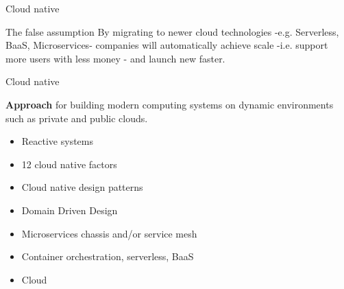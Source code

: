 \documentclass[aspectratio=169]{beamer}
\begin{document}
{
    \begin{frame}
    \end{frame}
}



\begin{frame}{Cloud native}

\begin{alertblock}{The false assumption}
By migrating to newer cloud technologies -e.g. Serverless, BaaS, Microservices- companies will automatically achieve scale -i.e. support more users with less money - and launch new faster.
\end{alertblock}


\end{frame}



\begin{frame}{Cloud native}

\textbf{Approach} for building modern computing systems on dynamic environments such as private and public clouds.

	\begin{itemize}
		\item Reactive systems
		\item 12 cloud native factors
        \item Cloud native design patterns
        \item Domain Driven Design
		\item Microservices chassis and/or service mesh
        \item Container orchestration, serverless, BaaS
        \item Cloud
	\end{itemize}

\end{frame}
\end{document}
